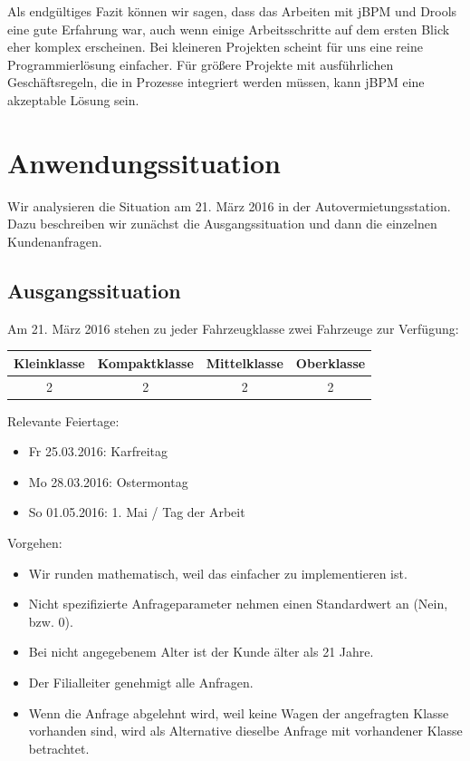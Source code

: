Als endgültiges Fazit können wir sagen, dass das Arbeiten mit jBPM und Drools eine gute Erfahrung war, auch wenn einige Arbeitsschritte auf dem ersten Blick eher komplex erscheinen. Bei kleineren Projekten scheint für uns eine reine Programmierlösung einfacher. Für größere Projekte mit ausführlichen Geschäftsregeln, die in Prozesse
integriert werden müssen, kann jBPM eine akzeptable Lösung sein. 

\appendix

\section{Anwendungssituation}
\label{sec:Anwendungssituation}

Wir analysieren die Situation am 21. März 2016 in der Autovermietungsstation.
Dazu beschreiben wir zunächst die Ausgangssituation und dann die einzelnen Kundenanfragen.

\subsection{Ausgangssituation}

Am 21. März 2016 stehen zu jeder Fahrzeugklasse zwei Fahrzeuge zur Verfügung:

\begin{tabular}{|c|c|c|c|}
	\hline \textbf{Kleinklasse} & \textbf{Kompaktklasse} & \textbf{Mittelklasse} & \textbf{Oberklasse}  \\ 
	\hline 2 & 2 & 2 & 2 \\ 
	\hline 
\end{tabular} 

Relevante Feiertage:
\begin{itemize}
	\item Fr 25.03.2016: Karfreitag
	\item Mo 28.03.2016: Ostermontag
	\item So 01.05.2016: 1. Mai / Tag der Arbeit
\end{itemize}

Vorgehen:
\begin{itemize}
	\item Wir runden mathematisch, weil das einfacher zu implementieren ist.
	\item Nicht spezifizierte Anfrageparameter nehmen einen Standardwert an (Nein, bzw. 0).
	\item Bei nicht angegebenem Alter ist der Kunde älter als 21 Jahre.
	\item Der Filialleiter genehmigt alle Anfragen.
	\item Wenn die Anfrage abgelehnt wird, weil keine Wagen der angefragten Klasse vorhanden sind,
	wird als Alternative dieselbe Anfrage mit vorhandener Klasse betrachtet.
\end{itemize}

